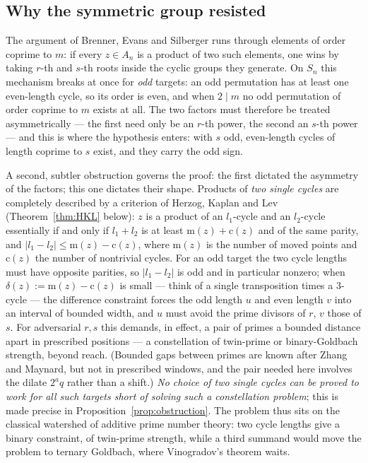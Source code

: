 \documentclass[11pt]{amsart}
\numberwithin{equation}{section}
\theoremstyle{remark}
\newcommand{\md}{\mathrm{m}}   %
\newcommand{\cy}{\mathrm{c}}   %
\begin{document}
\subsection*{Why the symmetric group resisted}
The argument of Brenner, Evans and Silberger runs through elements of order
coprime to
$m$: if every $z\in A_n$ is a product of two such elements, one wins by taking
$r$-th and $s$-th roots inside the cyclic groups they generate. On $S_n$ this
mechanism breaks at once for \emph{odd} targets: an odd permutation has at least
one even-length cycle, so its order is even, and when $2\mid m$ no odd permutation
of order coprime to $m$ exists at all. The two factors must therefore be treated
asymmetrically --- the first need only be an $r$-th power, the second an $s$-th
power --- and this is where the hypothesis enters: with $s$ odd, even-length cycles
of length coprime to $s$ exist, and they carry the odd sign.

A second, subtler obstruction governs the proof: the first dictated the
asymmetry of the factors; this one dictates their shape. Products of \emph{two
single cycles} are completely described by a criterion of Herzog, Kaplan and Lev
(Theorem~\ref{thm:HKL} below): $z$ is a product of an $l_1$-cycle and an
$l_2$-cycle essentially if and only if $l_1+l_2$ is at least $\md(z)+\cy(z)$ and of
the same parity, and $|l_1-l_2|\le \md(z)-\cy(z)$, where $\md(z)$ is the number of
moved points and $\cy(z)$ the number of nontrivial cycles. For an odd target the
two cycle lengths must have opposite parities, so $|l_1-l_2|$ is odd and in
particular nonzero; when $\delta(z):=\md(z)-\cy(z)$ is small --- think of a single
transposition times a $3$-cycle --- the difference constraint forces the odd length
$u$ and even length $v$ into an interval of bounded width, and $u$ must avoid the
prime divisors of $r$, $v$ those of $s$. For adversarial $r,s$ this demands, in
effect, a pair of primes a bounded distance apart in prescribed positions --- a
constellation of twin-prime or binary-Goldbach strength, beyond reach. (Bounded
gaps between primes are known after Zhang and Maynard, but not in prescribed
windows, and the pair needed here involves the dilate $2^aq$ rather than a
shift.)
\emph{No choice of two single cycles can be proved to work for all such targets
short of solving such a constellation problem}; this is made precise in
Proposition~\ref{prop:obstruction}. The problem thus sits on the classical
watershed of additive prime number theory: two cycle lengths give a binary
constraint, of twin-prime strength, while a third summand would move the problem
to ternary Goldbach, where Vinogradov's theorem waits.
\end{document}
